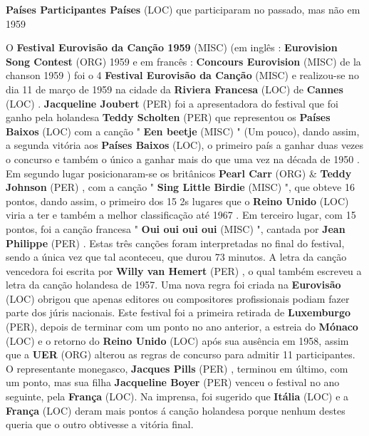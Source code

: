 \documentclass[12pt,a4paper]{article}
\begin{document}
\textbf{Países Participantes Países} (LOC) que participaram no passado, mas não em 1959

O \textbf{Festival Eurovisão da Canção 1959} (MISC) (em inglês : \textbf{Eurovision Song Contest} (ORG) 1959 e em francês : \textbf{Concours Eurovision} (MISC) de la chanson 1959 ) foi o 4 \textbf{Festival Eurovisão da Canção} (MISC) e realizou-se no dia 11 de março de 1959 na cidade da \textbf{Riviera Francesa} (LOC) de \textbf{Cannes} (LOC) . \textbf{Jacqueline Joubert} (PER) foi a apresentadora do festival que foi ganho pela holandesa \textbf{Teddy Scholten} (PER) que representou os \textbf{Países Baixos} (LOC) com a canção " \textbf{Een beetje} (MISC) " (Um pouco), dando assim, a segunda vitória aos \textbf{Países Baixos} (LOC), o primeiro país a ganhar duas vezes o concurso e também o único a ganhar mais do que uma vez na década de 1950 . Em segundo lugar posicionaram-se os britânicos \textbf{Pearl Carr} (ORG) \& \textbf{Teddy Johnson} (PER) , com a canção " \textbf{Sing Little Birdie} (MISC) ", que obteve 16 pontos, dando assim, o primeiro dos 15 2s lugares que o \textbf{Reino Unido} (LOC) viria a ter e também a melhor classificação até 1967 . Em terceiro lugar, com 15 pontos, foi a canção francesa " \textbf{Oui oui oui oui} (MISC) ", cantada por \textbf{Jean Philippe} (PER) . Estas três canções foram interpretadas no final do festival, sendo a única vez que tal aconteceu, que durou 73 minutos. A letra da canção vencedora foi escrita por \textbf{Willy van Hemert} (PER) , o qual também escreveu a letra da canção holandesa de 1957. Uma nova regra foi criada na \textbf{Eurovisão} (LOC) obrigou que apenas editores ou compositores profissionais podiam fazer parte dos júris nacionais. Este festival foi a primeira retirada de \textbf{Luxemburgo} (PER), depois de terminar com um ponto no ano anterior, a estreia do \textbf{Mónaco} (LOC) e o retorno do \textbf{Reino Unido} (LOC) após sua ausência em 1958, assim que a \textbf{UER} (ORG) alterou as regras de concurso para admitir 11 participantes. O representante monegasco, \textbf{Jacques Pills} (PER) , terminou em último, com um ponto, mas sua filha \textbf{Jacqueline Boyer} (PER) venceu o festival no ano seguinte, pela \textbf{França} (LOC). Na imprensa, foi sugerido que \textbf{Itália} (LOC) e a \textbf{França} (LOC) deram mais pontos á canção holandesa porque nenhum destes queria que o outro obtivesse a vitória final.
\end{document}
